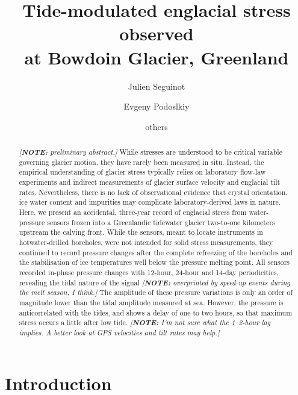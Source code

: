 \documentclass[utf8]{article}
\title{
    Tide-modulated englacial stress observed \\
    at Bowdoin Glacier, Greenland}
\author[?]{Julien Seguinot}
\author[1]{Evgeny Podoslkiy}
\author[ ]{others}
\affil[1]{Arctic Research Center, Hokkaido University, Sapporo, Japan}
\newcommand{\note}[1]{\textcolor{c0}{\emph{[\textbf{NOTE:} #1]}}}
\begin{document}

\maketitle

\begin{abstract}

    \note{preliminary abstract.}
    While stresses are understood to be critical variable governing
    glacier motion, they have rarely been measured in situ. Instead, the
    empirical understanding of glacier stress typically relies on laboratory
    flow-law experiments and indirect measurements of glacier surface velocity
    and englacial tilt rates. Nevertheless, there is no lack of observational
    evidence that crystal orientation, ice water content and impurities may
    complicate laboratory-derived laws in nature.
    Here, we present an accidental, three-year record of englacial stress
    from water-pressure sensors frozen into a Greenlandic tidewater glacier
    two-to-one kilometers upstream the calving front.
    While the sensors, meant to locate instruments in hotwater-drilled
    boreholes, were not intended for solid stress measurements, they
    continued to record pressure changes after the complete refreezing of the
    boreholes and the stabilisation of ice temperatures well below the pressure
    melting point.
    All sensors recorded in-phase pressure changes with 12-hour, 24-hour and
    14-day periodicities, revealing the tidal nature of the signal
    \note{overprinted by speed-up events during the melt season, I think.}
    The amplitude of these pressure variations is only an order of magnitude
    lower than the tidal amplitude measured at sea. However, the pressure is
    anticorrelated with the tides, and shows a delay of one to two hours, so
    that maximum stress occurs a little after low tide.
    \note{%
      I'm not sure what the 1--2-hour lag implies. A better look at GPS
      velocities and tilt rates may help.}
\end{abstract}


\section{Introduction}
\end{document}
